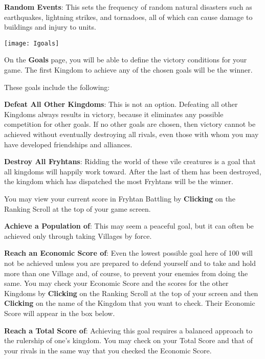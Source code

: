 \textbf{Random Events}: This sets the frequency of random natural disasters such as earthquakes, lightning strikes, and tornadoes, all of which can cause damage to buildings and injury to units.


\begin{center}
    \texttt{[image: Igoals]} %
\end{center}

On the \textbf{Goals} page, you will be able to define the victory conditions for your game. The first Kingdom to achieve any of the chosen goals will be the winner.

These goals include the following:

\textbf{Defeat All Other Kingdoms}: This is not an option. Defeating all other Kingdoms always results in victory, because it eliminates any possible competition for other goals. If no other goals are chosen, then victory cannot be achieved without eventually destroying all rivals, even those with whom you may have developed friendships and alliances.

\textbf{Destroy All Fryhtans}: Ridding the world of these vile creatures is a goal that all kingdoms will happily work toward. After the last of them has been destroyed, the kingdom which has dispatched the most Fryhtans will be the winner.

You may view your current score in Fryhtan Battling by \textbf{Clicking} on the Ranking Scroll at the top of your game screen.

\textbf{Achieve a Population of}: This may seem a peaceful goal, but it can often be achieved only through taking Villages by force.

\textbf{Reach an Economic Score of}: Even the lowest possible goal here of 100 will not be achieved unless you are prepared to defend yourself and to take and hold more than one Village and, of course, to prevent your enemies from doing the same. You may check your Economic Score and the scores for the other Kingdoms by \textbf{Clicking} on the Ranking Scroll at the top of your screen and then \textbf{Clicking} on the name of the Kingdom that you want to check. Their Economic Score will appear in the box below.

\textbf{Reach a Total Score of}: Achieving this goal requires a balanced approach to the rulership of one’s kingdom. You may check on your Total Score and that of your rivals in the same way that you checked the Economic Score.

